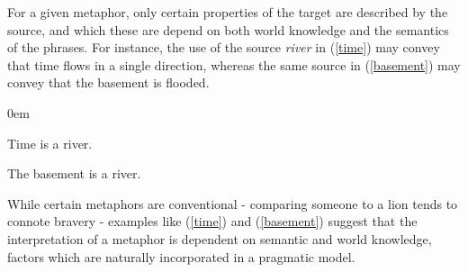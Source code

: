 \documentclass[9pt,twocolumn,twoside,lineno]{pnas-new}
\begin{document}


	For a given metaphor, only certain properties of the target are described by the source, and which these are depend on both world knowledge and the semantics of the phrases. For instance, the use of the source \emph{river} in (\ref{time}) may convey that time flows in a single direction, whereas the same source in (\ref{basement}) may convey that the basement is flooded.

	\begin{examples}
	\itemsep0em 
	\item Time is a river. \label{time}
	\item The basement is a river. \label{basement}
	\end{examples}


	While certain metaphors are conventional - comparing someone to a lion tends to connote bravery - examples like (\ref{time}) and (\ref{basement}) suggest that the interpretation of a metaphor is dependent on semantic and world knowledge, factors which are naturally incorporated in a pragmatic model.
	
\end{document}
